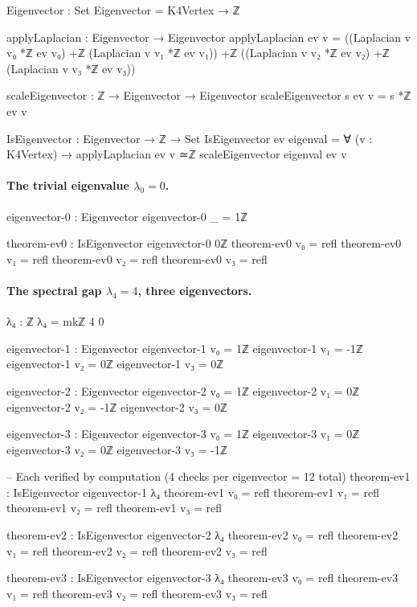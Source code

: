 \documentclass[11pt,a4paper]{article}
\begin{document}
\begin{code}
Eigenvector : Set
Eigenvector = K4Vertex → ℤ

applyLaplacian : Eigenvector → Eigenvector
applyLaplacian ev v =
  ((Laplacian v v₀ *ℤ ev v₀) +ℤ (Laplacian v v₁ *ℤ ev v₁)) +ℤ
  ((Laplacian v v₂ *ℤ ev v₂) +ℤ (Laplacian v v₃ *ℤ ev v₃))

scaleEigenvector : ℤ → Eigenvector → Eigenvector
scaleEigenvector s ev v = s *ℤ ev v

IsEigenvector : Eigenvector → ℤ → Set
IsEigenvector ev eigenval = ∀ (v : K4Vertex) →
  applyLaplacian ev v ≃ℤ scaleEigenvector eigenval ev v
\end{code}

\paragraph{The trivial eigenvalue $\lambda_0 = 0$.}

\begin{code}
eigenvector-0 : Eigenvector
eigenvector-0 _ = 1ℤ

theorem-ev0 : IsEigenvector eigenvector-0 0ℤ
theorem-ev0 v₀ = refl
theorem-ev0 v₁ = refl
theorem-ev0 v₂ = refl
theorem-ev0 v₃ = refl
\end{code}

\paragraph{The spectral gap $\lambda_4 = 4$, three eigenvectors.}

\begin{code}
λ₄ : ℤ
λ₄ = mkℤ 4 0

eigenvector-1 : Eigenvector
eigenvector-1 v₀ = 1ℤ
eigenvector-1 v₁ = -1ℤ
eigenvector-1 v₂ = 0ℤ
eigenvector-1 v₃ = 0ℤ

eigenvector-2 : Eigenvector
eigenvector-2 v₀ = 1ℤ
eigenvector-2 v₁ = 0ℤ
eigenvector-2 v₂ = -1ℤ
eigenvector-2 v₃ = 0ℤ

eigenvector-3 : Eigenvector
eigenvector-3 v₀ = 1ℤ
eigenvector-3 v₁ = 0ℤ
eigenvector-3 v₂ = 0ℤ
eigenvector-3 v₃ = -1ℤ

-- Each verified by computation (4 checks per eigenvector = 12 total)
theorem-ev1 : IsEigenvector eigenvector-1 λ₄
theorem-ev1 v₀ = refl
theorem-ev1 v₁ = refl
theorem-ev1 v₂ = refl
theorem-ev1 v₃ = refl

theorem-ev2 : IsEigenvector eigenvector-2 λ₄
theorem-ev2 v₀ = refl
theorem-ev2 v₁ = refl
theorem-ev2 v₂ = refl
theorem-ev2 v₃ = refl

theorem-ev3 : IsEigenvector eigenvector-3 λ₄
theorem-ev3 v₀ = refl
theorem-ev3 v₁ = refl
theorem-ev3 v₂ = refl
theorem-ev3 v₃ = refl
\end{code}
\end{document}
